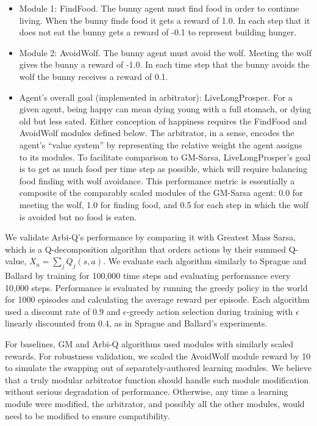 \begin{itemize}

\item Module 1: FindFood.  The bunny agent must find food in order to continue living.  When the bunny finds food it gets a reward of 1.0. In each step that it does not eat the bunny gets a reward of -0.1 to represent building hunger.

\item Module 2: AvoidWolf.  The bunny agent must avoid the wolf. Meeting the wolf gives the bunny a reward of -1.0. In each time step that the bunny avoids the wolf the bunny receives a reward of 0.1.

\item Agent's overall goal (implemented in arbitrator): LiveLongProsper.  For a given agent, being happy can mean dying young with a full stomach, or dying old but less sated.  Either conception of happiness requires the FindFood and AvoidWolf modules defined below.  The arbitrator, in a sense, encodes the agent's ``value system'' by representing the relative weight the agent assigns to its modules. To facilitate comparison to GM-Sarsa, LiveLongProsper's goal is to get as much food per time step as possible, which will require balancing food finding with wolf avoidance. This performance metric is essentially a composite of the comparably scaled modules of the GM-Sarsa agent: 0.0 for meeting the wolf, 1.0 for finding food, and 0.5 for each step in which the wolf is avoided but no food is eaten.

\end{itemize}


We validate Arbi-Q's performance by comparing it with Greatest Mass Sarsa, which is a Q-decomposition algorithm that orders actions by their summed Q-value, $X_a=\sum_j Q_j(s,a)$. We evaluate each algorithm similarly to Sprague and Ballard \cite{sprague2003multiple-goal} by training for 100,000 time steps and evaluating performance every 10,000 steps.  Performance is evaluated by running the greedy policy in the world for 1000 episodes and calculating the average reward per episode.  Each algorithm used a discount rate of 0.9 and $\epsilon$-greedy action selection during training with $\epsilon$ linearly discounted from 0.4, as in Sprague and Ballard's experiments.

For baselines, GM and Arbi-Q algorithms used modules with similarly scaled rewards. For robustness validation, we scaled the AvoidWolf module reward by 10 to simulate the swapping out of separately-authored learning modules.  We believe that a truly modular arbitrator function should handle such module modification without serious degradation of performance.  Otherwise, any time a learning module were modified, the arbitrator, and possibly all the other modules, would need to be modified to ensure compatibility.

